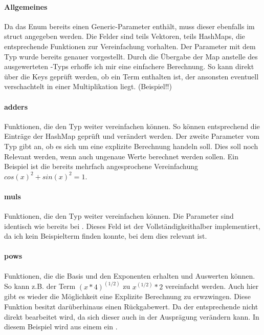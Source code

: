 \documentclass[11pt,a4paper, ngerman]{article}
\begin{document}
\paragraph{Allgemeines} Da das Enum  bereits einen Generic-Parameter enthält, muss dieser ebenfalls im struct angegeben werden. Die Felder sind teils Vektoren, teils HashMaps, die entsprechende Funktionen zur Vereinfachung vorhalten. Der Parameter mit dem Typ  wurde bereits genauer vorgestellt. Durch die Übergabe der Map anstelle des ausgewerteten -Typs erhoffe ich mir eine einfachere Berechnung. So kann direkt über die Keys geprüft werden, ob ein Term enthalten ist, der ansonsten eventuell verschachtelt in einer Multiplikation liegt. (Beispiel!!)

\paragraph{adders} Funktionen, die den Typ  weiter vereinfachen können. So können entsprechend die Einträge der HashMap geprüft und verändert werden. Der zweite Parameter vom Typ  gibt an, ob es sich um eine explizite Berechnung handeln soll. Dies soll noch Relevant werden, wenn auch ungenaue Werte berechnet werden sollen. Ein Beispiel ist die bereits mehrfach angesprochene Vereinfachung $cos(x)^2+sin(x)^2 = 1$.

\paragraph{muls} Funktionen, die den Typ  weiter vereinfachen können. Die Parameter sind identisch wie bereits bei . Dieses Feld ist der Vollständigkeithalber implementiert, da ich kein Beispielterm finden konnte, bei dem dies relevant ist.

\paragraph{pows} Funktionen, die die Basis und den Exponenten erhalten und Auswerten können. So kann z.B. der Term $(x*4)^{(1/2)}$ zu $x^{(1/2)}*2$ vereinfacht werden. Auch hier gibt es wieder die Möglichkeit eine Explizite Berechnung zu erwzwingen. Diese Funktion besitzt darüberhinaus einen Rückgabewert. Da der entsprechende  nicht direkt bearbeitet wird, da sich dieser auch in der Ausprägung verändern kann. In diesem Beispiel wird aus einem  ein .
\end{document}
